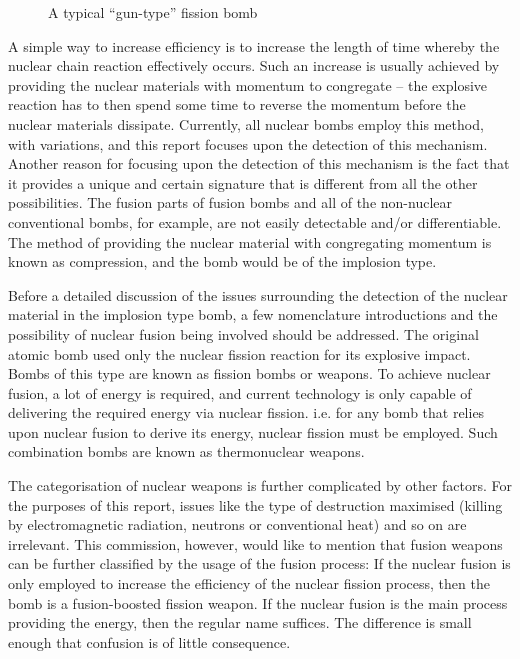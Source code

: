 \documentclass[twoside,titlepage,11pt,twocolumn,a4paper]{article}
\begin{document}
\begin{figure}
  \caption{A typical ``gun-type'' fission bomb}
\end{figure}

A simple way to increase efficiency is to increase the length of time
whereby the nuclear chain reaction effectively occurs. Such an
increase is usually achieved by providing the nuclear materials with
momentum to congregate -- the explosive reaction has to then spend
some time to reverse the momentum before the nuclear materials
dissipate. Currently, all nuclear bombs employ this method, with
variations, and this report focuses upon the detection of this
mechanism. Another reason for focusing upon the detection of this
mechanism is the fact that it provides a unique and certain signature
that is different from all the other possibilities. The fusion parts
of fusion bombs and all of the non-nuclear conventional bombs, for
example, are not easily detectable and/or differentiable. The method
of providing the nuclear material with congregating momentum is known
as compression, and the bomb would be of the implosion type.

Before a detailed discussion of the issues surrounding the detection
of the nuclear material in the implosion type bomb, a few
nomenclature introductions and the possibility of nuclear fusion being
involved should be addressed. The original atomic bomb used only the
nuclear fission reaction for its explosive impact. Bombs of this type
are known as fission bombs or weapons. To achieve nuclear fusion, a
lot of energy is required, and current technology is only capable of
delivering the required energy via nuclear fission. i.e. for any bomb
that relies upon nuclear fusion to derive its energy, nuclear fission
must be employed. Such combination bombs are known as thermonuclear
weapons.

The categorisation of nuclear weapons is further complicated by other
factors. For the purposes of this report, issues like the type of
destruction maximised (killing by electromagnetic radiation, neutrons
or conventional heat) and so on are irrelevant. This commission,
however, would like to mention that fusion weapons can be further
classified by the usage of the fusion process: If the nuclear fusion
is only employed to increase the efficiency of the nuclear fission
process, then the bomb is a fusion-boosted fission weapon. If the
nuclear fusion is the main process providing the energy, then the
regular name suffices. The difference is small enough that confusion
is of little consequence.
\end{document}

